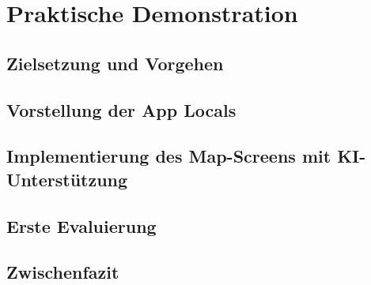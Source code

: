 \chapter{Praktische Demonstration}

\section{Zielsetzung und Vorgehen}


\section{Vorstellung der App \glqq Locals\grqq}


\section{Implementierung des Map-Screens mit KI-Unterstützung}


\section{Erste Evaluierung}


\section{Zwischenfazit}
 